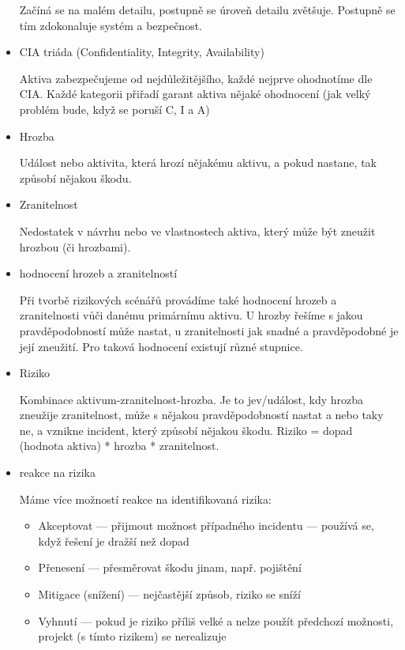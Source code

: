 \begin{itemize}
		Začíná se na malém detailu, postupně se úroveň detailu zvětšuje. Postupně se tím zdokonaluje systém a bezpečnost.
		
	\item CIA triáda (Confidentiality, Integrity, Availability)
	
		Aktiva zabezpečujeme od nejdůležitějšího, každé nejprve ohodnotíme dle CIA. Každé kategorii přiřadí garant aktiva nějaké ohodnocení (jak velký problém bude, když se poruší C, I a A)
		
	\item Hrozba
	
		Událost nebo aktivita, která hrozí nějakému aktivu, a pokud nastane, tak způsobí nějakou škodu.
		
	\item Zranitelnost
	
		Nedostatek v návrhu nebo ve vlastnostech aktiva, který může být zneužit hrozbou (či hrozbami).
		
	\item hodnocení hrozeb a zranitelností
	
		Při tvorbě rizikových scénářů provádíme také hodnocení hrozeb a zranitelnosti vůči danému primárnímu aktivu. U hrozby řešíme s jakou pravděpodobností může nastat, u zranitelnosti jak snadné a prav\-dě\-po\-dob\-né je její zneužití. Pro taková hodnocení existují různé stupnice.
		
	\item Riziko
	
		Kombinace aktivum-zranitelnost-hrozba. Je to jev/událost, kdy hrozba zneužije zranitelnost, může s nějakou pravděpodobností nastat a nebo taky ne, a vznikne incident, který způsobí nějakou škodu. Riziko = dopad (hodnota aktiva) * hrozba * zranitelnost. 
		
	\item reakce na rizika
	
	Máme více možností reakce na identifikovaná rizika:
		\begin{itemize}
			\item Akceptovat --- přijmout možnost případného incidentu --- používá se, když řešení je dražší než dopad
			\item Přenesení --- přesměrovat škodu jinam, např. pojištění
			\item Mitigace (snížení) --- nejčastější způsob, riziko se sníží
			\item Vyhnutí --- pokud je riziko příliš velké a nelze použít předchozí možnosti, projekt (s tímto rizikem) se nerealizuje
		\end{itemize}
		

\end{itemize}
